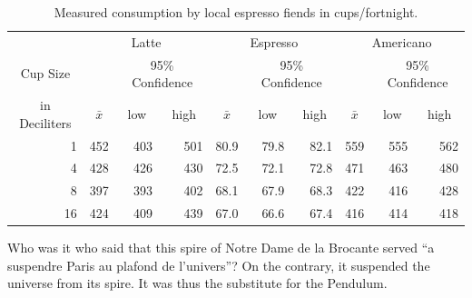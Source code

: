 \documentclass[11pt]{article}
\begin{document}
\begin{table}[tbh]
\centering
\caption{Measured consumption by local espresso fiends in cups/fortnight.}\label{scsi-table}
\medskip
\begin{tabular}{rrrrrrrrrr}
\toprule
\multicolumn{1}{c}{} & \multicolumn{3}{c}{Latte} & \multicolumn{3}{c}{Espresso} &
        \multicolumn{3}{c}{Americano} \\
\cmidrule(rl){2-4}\cmidrule(rl){5-7} \cmidrule(rl){8-10}
\multicolumn{1}{c}{Cup Size}
& & \multicolumn{2}{c}{95\% Confidence}
& & \multicolumn{2}{c}{95\% Confidence}
& & \multicolumn{2}{c}{95\% Confidence} \\ \cmidrule(rl){3-4}\cmidrule(rl){6-7} \cmidrule(rl){9-10}
\multicolumn{1}{c}{in Deciliters}
& \multicolumn{1}{c}{$\bar x$} & \multicolumn{1}{c}{low} & \multicolumn{1}{c}{high}
& \multicolumn{1}{c}{$\bar x$} & \multicolumn{1}{c}{low} & \multicolumn{1}{c}{high}
& \multicolumn{1}{c}{$\bar x$} & \multicolumn{1}{c}{low} & \multicolumn{1}{c}{high} \\
\midrule
1 & 452 & 403 & 501 & 80.9 & 79.8 & 82.1 & 559 & 555 & 562 \\
4 & 428 & 426 & 430 & 72.5 & 72.1 & 72.8 & 471 & 463 & 480 \\
8 & 397 & 393 & 402 & 68.1 & 67.9 & 68.3 & 422 & 416 & 428 \\
16 & 424 & 409 & 439 & 67.0 & 66.6 & 67.4 & 416 & 414 & 418 \\
\bottomrule
\end{tabular}
\end{table}

Who was it who said that this spire of Notre Dame de la Brocante
served ``a suspendre Paris au plafond de l'univers''? On the contrary,
it suspended the universe from its spire. It was thus the substitute
for the Pendulum.
\end{document}
